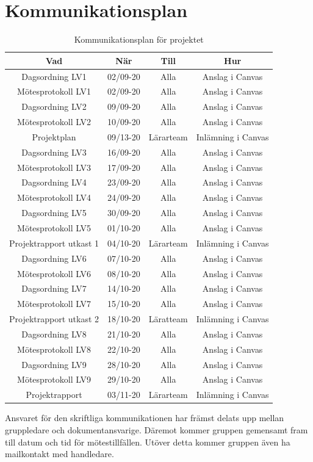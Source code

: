 \documentclass[a4paper]{article}
\begin{document}
\section{Kommunikationsplan}

\begin{table}[H]
    \centering
    \begin{tabular}{ |c|c|c|c| }\hline
     Vad & När & Till & Hur \\\hline
     Dagsordning LV1 & 02/09-20 & Alla & Anslag i Canvas \\\hline
     Mötesprotokoll LV1 & 02/09-20 & Alla & Anslag i Canvas \\\hline
     Dagsordning LV2 & 09/09-20 & Alla & Anslag i Canvas \\\hline
     Mötesprotokoll LV2 & 10/09-20 & Alla & Anslag i Canvas \\\hline
     Projektplan & 09/13-20 & Lärarteam & Inlämning i Canvas\\\hline 
     Dagsordning LV3 & 16/09-20 & Alla & Anslag i Canvas \\\hline
     Mötesprotokoll LV3 & 17/09-20 & Alla & Anslag i Canvas \\\hline
     Dagsordning LV4 & 23/09-20 & Alla & Anslag i Canvas \\\hline
     Mötesprotokoll LV4 & 24/09-20 & Alla & Anslag i Canvas \\\hline
     Dagsordning LV5 & 30/09-20 & Alla & Anslag i Canvas \\\hline
     Mötesprotokoll LV5 & 01/10-20 & Alla & Anslag i Canvas \\\hline
     Projektrapport utkast 1 & 04/10-20 & Lärarteam & Inlämning i Canvas \\\hline
     Dagsordning LV6 & 07/10-20 & Alla & Anslag i Canvas \\\hline
     Mötesprotokoll LV6 & 08/10-20 & Alla & Anslag i Canvas \\\hline
     Dagsordning LV7 & 14/10-20 & Alla & Anslag i Canvas \\\hline
     Mötesprotokoll LV7 & 15/10-20 & Alla & Anslag i Canvas \\\hline
     Projektrapport utkast 2 & 18/10-20 & Läratteam & Inlämning i Canvas \\\hline
     Dagsordning LV8 & 21/10-20 & Alla & Anslag i Canvas \\\hline
     Mötesprotokoll LV8 & 22/10-20 & Alla & Anslag i Canvas \\\hline
     Dagsordning LV9 & 28/10-20 & Alla & Anslag i Canvas \\\hline
     Mötesprotokoll LV9 & 29/10-20 & Alla & Anslag i Canvas \\\hline
     Projektrapport & 03/11-20 & Lärarteam & Inlämning i Canvas \\\hline
    \end{tabular}
    \caption{Kommunikationsplan för projektet}
    \label{table:kommunikationsplan}
\end{table}
Ansvaret för den skriftliga kommunikationen har främst delats upp mellan gruppledare och dokumentansvarige. Däremot kommer gruppen gemensamt fram till datum och tid för mötestillfällen. Utöver detta kommer gruppen även ha mailkontakt med handledare. 
\end{document}
